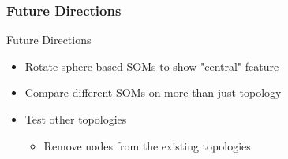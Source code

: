 \documentclass[nototal,handout]{beamer}
\begin{document}
\begin{frame}
	\frametitle{Future Directions}
 
\begin{block}{Future Directions}
 \begin{itemize}
 \item  Rotate sphere-based SOMs to show "central" feature
 \item  Compare different SOMs on more than just topology
 \item  Test other topologies
 \begin{itemize}
 \item  Remove nodes from the existing topologies
 \end{itemize}
 \end{itemize}
 \end{block} \end{frame}
\end{document}
